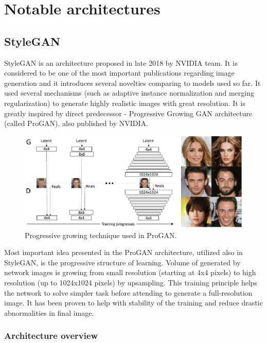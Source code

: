 \documentclass[12pt,a4paper,openany]{book}
\begin{document}
\chapter{Notable architectures}
\section{StyleGAN}

StyleGAN is an architecture proposed in late 2018 by NVIDIA team. It is considered to be one of the most important publications regarding image generation and it introduces several novelties comparing to models used so far. It used several mechanisms (such as adaptive instance normalization and merging regularization) to generate highly realistic images with great resolution. It is greatly inspired by direct predecessor - Progressive Growing GAN architecture (called ProGAN), also published by NVIDIA.

\begin{figure}[ht!]
    \centering
    \includegraphics[scale=1.0]{figs/progan-scheme.eps}
    \caption{Progressive growing technique used in ProGAN.}\label{Fig:PROGAN}
\end{figure}

Most important idea presented in the ProGAN architecture, utilized also in StyleGAN, is the progressive structure of learning. Volume of generated by network images is growing from small resolution (starting at 4x4 pixels) to high resolution (up to 1024x1024 pixels) by upsampling. This training principle helps the network to solve simpler task before attending to generate a full-resolution image. It has been proven to help with stability of the training and reduce drastic abnormalities in final image.

\subsection{Architecture overview}
\end{document}
